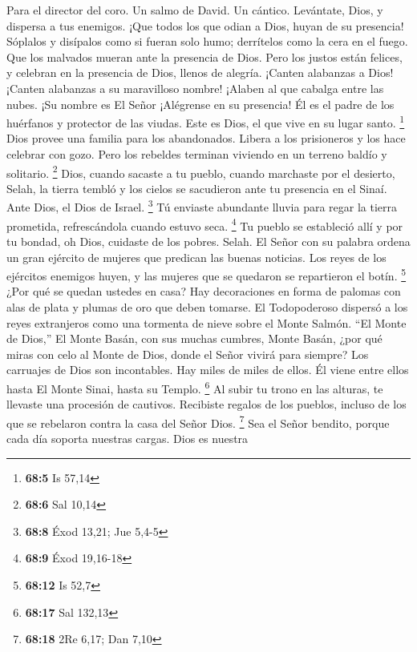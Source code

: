 Para el director del coro. Un salmo de David. Un cántico. 
Levántate, Dios, y dispersa a tus enemigos. ¡Que todos los que odian a
Dios, huyan de su presencia!  Sóplalos y disípalos como si
fueran solo humo; derrítelos como la cera en el fuego. Que los malvados
mueran ante la presencia de Dios.  Pero los justos están
felices, y celebran en la presencia de Dios, llenos de alegría.
 ¡Canten alabanzas a Dios! ¡Canten alabanzas a su
maravilloso nombre! ¡Alaben al que cabalga entre las nubes. ¡Su nombre
es El Señor ¡Alégrense en su presencia!  Él es el padre de
los huérfanos y protector de las viudas. Este es Dios, el que vive en su
lugar santo. \footnote{\textbf{68:5} Is 57,14}  Dios provee
una familia para los abandonados. Libera a los prisioneros y los hace
celebrar con gozo. Pero los rebeldes terminan viviendo en un terreno
baldío y solitario. \footnote{\textbf{68:6} Sal 10,14} 
Dios, cuando sacaste a tu pueblo, cuando marchaste por el desierto,
Selah,  la tierra tembló y los cielos se sacudieron ante tu
presencia en el Sinaí. Ante Dios, el Dios de Israel. \footnote{\textbf{68:8}
  Éxod 13,21; Jue 5,4-5}  Tú enviaste abundante lluvia para
regar la tierra prometida, refrescándola cuando estuvo seca. \footnote{\textbf{68:9}
  Éxod 19,16-18}  Tu pueblo se estableció allí y por tu
bondad, oh Dios, cuidaste de los pobres. Selah.  El Señor
con su palabra ordena un gran ejército de mujeres que predican las
buenas noticias.  Los reyes de los ejércitos enemigos
huyen, y las mujeres que se quedaron se repartieron el botín.
\footnote{\textbf{68:12} Is 52,7}  ¿Por qué se quedan
ustedes en casa? Hay decoraciones en forma de palomas con alas de plata
y plumas de oro que deben tomarse.  El Todopoderoso
dispersó a los reyes extranjeros como una tormenta de nieve sobre el
Monte Salmón.  ``El Monte de Dios,'' El Monte Basán, con
sus muchas cumbres, Monte Basán,  ¿por qué miras con celo
al Monte de Dios, donde el Señor vivirá para siempre?  Los
carruajes de Dios son incontables. Hay miles de miles de ellos. Él viene
entre ellos hasta El Monte Sinai, hasta su Templo. \footnote{\textbf{68:17}
  Sal 132,13}  Al subir tu trono en las alturas, te
llevaste una procesión de cautivos. Recibiste regalos de los pueblos,
incluso de los que se rebelaron contra la casa del Señor Dios.
\footnote{\textbf{68:18} 2Re 6,17; Dan 7,10}  Sea el Señor
bendito, porque cada día soporta nuestras cargas. Dios es nuestra
